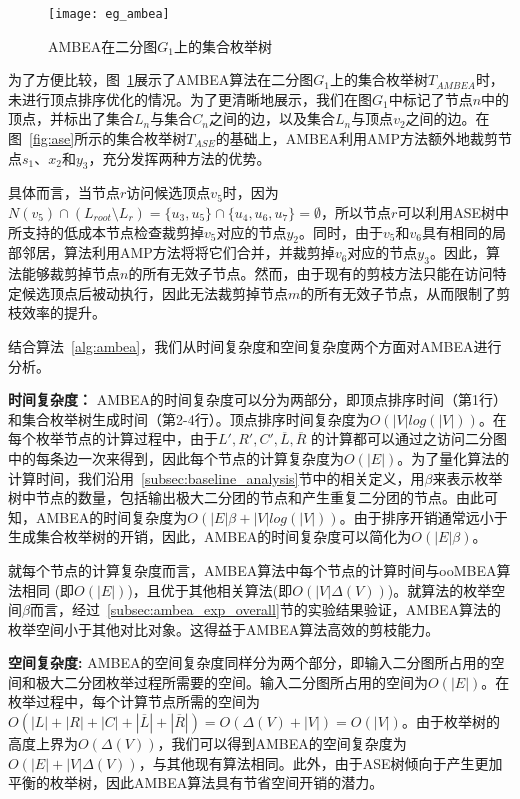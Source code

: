\begin{figure} [H]
	\centering
	
  \texttt{[image: eg\_ambea]}
  
	\caption{AMBEA在二分图$G_1$上的集合枚举树}
  \vspace{-0.1in}
	\label{fig:ambea}
\end{figure}

\begin{example}
  \label{example:ambea}
  为了方便比较，图~\ref{fig:ambea}展示了AMBEA算法在二分图$G_1$上的集合枚举树$T_{AMBEA}$时，未进行顶点排序优化的情况。为了更清晰地展示，我们在图$G_1$中标记了节点$n$中的顶点，并标出了集合$L_n$与集合$C_n$之间的边，以及集合$L_n$与顶点$v_2$之间的边。在图~\ref{fig:ase}所示的集合枚举树$T_{ASE}$的基础上，AMBEA利用AMP方法额外地裁剪节点$s_1$、$x_2$和$y_3$，充分发挥两种方法的优势。

  具体而言，当节点$r$访问候选顶点$v_5$时，因为$N(v_5) \cap (L_{root} \setminus L_r) = \{u_3, u_5\} \cap \{u_4, u_6, u_7\} = \emptyset$，所以节点$r$可以利用ASE树中所支持的低成本节点检查裁剪掉$v_5$对应的节点$y_2$。同时，由于$v_5$和$v_6$具有相同的局部邻居，算法利用AMP方法将将它们合并，并裁剪掉$v_6$对应的节点$y_3$。因此，算法能够裁剪掉节点$n$的所有无效子节点。然而，由于现有的剪枝方法只能在访问特定候选顶点后被动执行，因此无法裁剪掉节点$m$的所有无效子节点，从而限制了剪枝效率的提升。
\end{example}

结合算法~\ref{alg:ambea}，我们从时间复杂度和空间复杂度两个方面对AMBEA进行分析。

\textbf{时间复杂度：} AMBEA的时间复杂度可以分为两部分，即顶点排序时间（第1行）和集合枚举树生成时间（第2-4行）。顶点排序时间复杂度为$O(|V|log(|V|))$。在每个枚举节点的计算过程中，由于$L', R', C',\overline{L},\overline{R}$ 的计算都可以通过之访问二分图中的每条边一次来得到，因此每个节点的计算复杂度为$O(|E|)$。为了量化算法的计算时间，我们沿用~\ref{subsec:baseline_analysis}节中的相关定义，用$\beta$来表示枚举树中节点的数量，包括输出极大二分团的节点和产生重复二分团的节点。由此可知，AMBEA的时间复杂度为$O(|E|\beta + |V|log(|V|))$。由于排序开销通常远小于生成集合枚举树的开销，因此，AMBEA的时间复杂度可以简化为$O(|E|\beta)$。

就每个节点的计算复杂度而言，AMBEA算法中每个节点的计算时间与ooMBEA算法相同 (即$O(|E|)$)，且优于其他相关算法(即$O(|V|\Delta(V))$)。就算法的枚举空间$\beta$而言，经过~\ref{subsec:ambea_exp_overall}节的实验结果验证，AMBEA算法的枚举空间小于其他对比对象。这得益于AMBEA算法高效的剪枝能力。


\textbf{空间复杂度: } AMBEA的空间复杂度同样分为两个部分，即输入二分图所占用的空间和极大二分团枚举过程所需要的空间。输入二分图所占用的空间为$O(|E|)$。在枚举过程中，每个计算节点所需的空间为$O(|L|+|R|+|C|+|\overline{L}| + |\overline{R}|) = O(\Delta(V) + |V|) = O(|V|)$。由于枚举树的高度上界为$O(\Delta(V))$，我们可以得到AMBEA的空间复杂度为$O(|E|+|V|\Delta(V))$，与其他现有算法相同。此外，由于ASE树倾向于产生更加平衡的枚举树，因此AMBEA算法具有节省空间开销的潜力。

